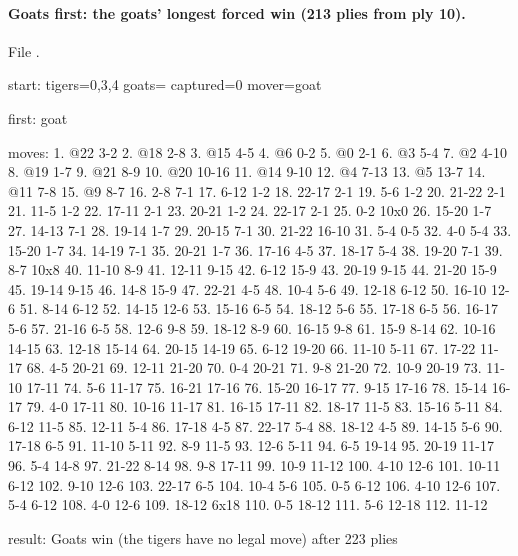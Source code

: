 \paragraph{Goats first: the goats' longest forced win (213 plies from ply 10).} File .
\begin{gamelisting}
start: tigers=0,3,4 goats= captured=0 mover=goat\par
first: goat\par
moves: 1. @22 3-2 2. @18 2-8 3. @15 4-5 4. @6 0-2 5. @0 2-1 6. @3 5-4 7. @2 4-10 8. @19 1-7 9. @21 8-9 10. @20 10-16 11. @14 9-10 12. @4 7-13 13. @5 13-7 14. @11 7-8 15. @9 8-7 16. 2-8 7-1 17. 6-12 1-2 18. 22-17 2-1 19. 5-6 1-2 20. 21-22 2-1 21. 11-5 1-2 22. 17-11 2-1 23. 20-21 1-2 24. 22-17 2-1 25. 0-2 10x0 26. 15-20 1-7 27. 14-13 7-1 28. 19-14 1-7 29. 20-15 7-1 30. 21-22 16-10 31. 5-4 0-5 32. 4-0 5-4 33. 15-20 1-7 34. 14-19 7-1 35. 20-21 1-7 36. 17-16 4-5 37. 18-17 5-4 38. 19-20 7-1 39. 8-7 10x8 40. 11-10 8-9 41. 12-11 9-15 42. 6-12 15-9 43. 20-19 9-15 44. 21-20 15-9 45. 19-14 9-15 46. 14-8 15-9 47. 22-21 4-5 48. 10-4 5-6 49. 12-18 6-12 50. 16-10 12-6 51. 8-14 6-12 52. 14-15 12-6 53. 15-16 6-5 54. 18-12 5-6 55. 17-18 6-5 56. 16-17 5-6 57. 21-16 6-5 58. 12-6 9-8 59. 18-12 8-9 60. 16-15 9-8 61. 15-9 8-14 62. 10-16 14-15 63. 12-18 15-14 64. 20-15 14-19 65. 6-12 19-20 66. 11-10 5-11 67. 17-22 11-17 68. 4-5 20-21 69. 12-11 21-20 70. 0-4 20-21 71. 9-8 21-20 72. 10-9 20-19 73. 11-10 17-11 74. 5-6 11-17 75. 16-21 17-16 76. 15-20 16-17 77. 9-15 17-16 78. 15-14 16-17 79. 4-0 17-11 80. 10-16 11-17 81. 16-15 17-11 82. 18-17 11-5 83. 15-16 5-11 84. 6-12 11-5 85. 12-11 5-4 86. 17-18 4-5 87. 22-17 5-4 88. 18-12 4-5 89. 14-15 5-6 90. 17-18 6-5 91. 11-10 5-11 92. 8-9 11-5 93. 12-6 5-11 94. 6-5 19-14 95. 20-19 11-17 96. 5-4 14-8 97. 21-22 8-14 98. 9-8 17-11 99. 10-9 11-12 100. 4-10 12-6 101. 10-11 6-12 102. 9-10 12-6 103. 22-17 6-5 104. 10-4 5-6 105. 0-5 6-12 106. 4-10 12-6 107. 5-4 6-12 108. 4-0 12-6 109. 18-12 6x18 110. 0-5 18-12 111. 5-6 12-18 112. 11-12\par
result: Goats win (the tigers have no legal move) after 223 plies\par
\end{gamelisting}

